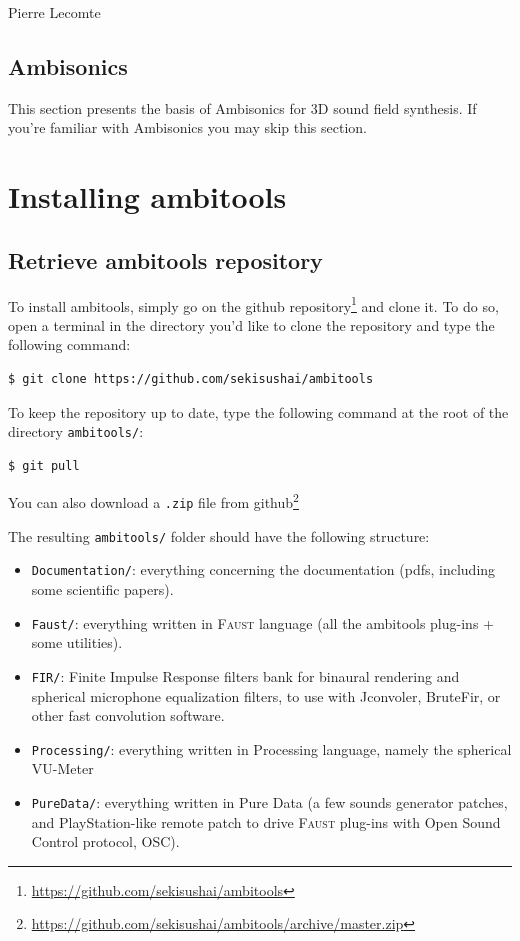 \documentclass[10pt,a4paper]{article}
\begin{document}
\begin{flushright}
Pierre Lecomte
\end{flushright}

\subsection{Ambisonics}
This section presents the basis of Ambisonics for 3D sound field synthesis. If you're familiar with Ambisonics you may skip this section.

\section{Installing ambitools}

\subsection{Retrieve ambitools repository}
To install ambitools, simply go on the github repository\footnote{\url{https://github.com/sekisushai/ambitools}} and clone it. To do so, open a terminal in the directory you'd like to clone the repository and type the following command:

\begin{lstlisting}
$ git clone https://github.com/sekisushai/ambitools
\end{lstlisting}

To keep the repository up to date, type the following command at the root of the directory \lstinline`ambitools/`:

\begin{lstlisting}
$ git pull
\end{lstlisting}

You can also download a \lstinline'.zip' file from github\footnote{\url{https://github.com/sekisushai/ambitools/archive/master.zip}}

The resulting \lstinline'ambitools/' folder should have the following structure:

\begin{itemize}
    \item \lstinline'Documentation/': everything concerning the documentation (pdfs, including some scientific papers).
    \item \lstinline'Faust/': everything written in \textsc{Faust} language (all the ambitools plug-ins + some utilities).
    \item \lstinline'FIR/': Finite Impulse Response filters bank for binaural rendering and spherical microphone equalization filters, to use with Jconvoler, BruteFir, or other fast convolution software.
    \item \lstinline'Processing/': everything written in Processing language, namely the spherical VU-Meter
    \item \lstinline'PureData/': everything written in Pure Data (a few sounds generator patches, and PlayStation-like remote patch to drive \textsc{Faust} plug-ins with Open Sound Control protocol, OSC).
\end{itemize}
\end{document}
